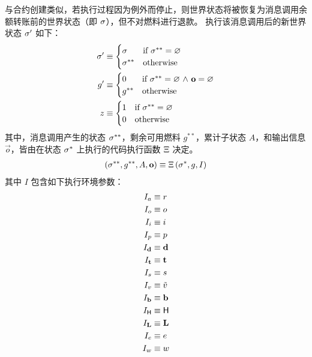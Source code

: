 与合约创建类似，若执行过程因为例外而停止，则世界状态将被恢复为消息调用余额转账前的世界状态（即 $\mathbf{\sigma}$），但不对燃料进行退款。
执行该消息调用后的新世界状态 $\mathbf{\sigma}'$ 如下：
\begin{align}
	\mathbf{\sigma}' &\equiv 
	\begin{cases}
		\mathbf{\sigma} 	 	& \mbox{if $\mathbf{\sigma}^{**}=\varnothing$}\\
		\mathbf{\sigma}^{**} 	& \mbox{otherwise}
	\end{cases}\\
	g' & \equiv 
	\begin{cases}
		0 & \mbox{if $\mathbf{\sigma}^{**} =\varnothing$ $\land$ $\mathbf{o}=\varnothing$}\\
		g^{**} & \mbox{otherwise}	
	\end{cases}\\
	z &\equiv 
	\begin{cases}
		1	 	& \mbox{if $\mathbf{\sigma}^{**}=\varnothing$}\\
		0	 	& \mbox{otherwise}
	\end{cases}
\end{align}
其中，消息调用产生的状态 $\mathbf{\sigma}^{**}$，剩余可用燃料 $g^{**}$，累计子状态 $A$，和输出信息 $\vec{o}$，皆由在状态 $\mathbf{\sigma}^*$ 上执行的代码执行函数 $\mathrm{\Xi}$ 决定。
\begin{align}
	\left(\mathbf{\sigma}^{**}, g^{**},  A, \mathbf{o} \right) \equiv \mathrm{\Xi} \left(\mathbf{\sigma}^*, g, I  \right)
\end{align}
其中 $I$ 包含如下执行环境参数：
\begin{align}
	I_a &\eqdef r\\
	I_o &\eqdef o\\
	I_i &\eqdef i\\
	I_p &\eqdef p\\
	I_\vec{d} &\eqdef \vec{d}\\
	I_\vec{t} &\eqdef \vec{t}\\
	I_s &\eqdef s\\
	I_v &\eqdef \tilde{v}\\
	I_\vec{b} &\eqdef \vec{b}\\
	I_{\head} & \eqdef \head \\
	I_{\mathbf{L}} & \eqdef \mathbf{L}\\ 
	I_e &\eqdef e\\
	I_w &\eqdef w	%
\end{align}



